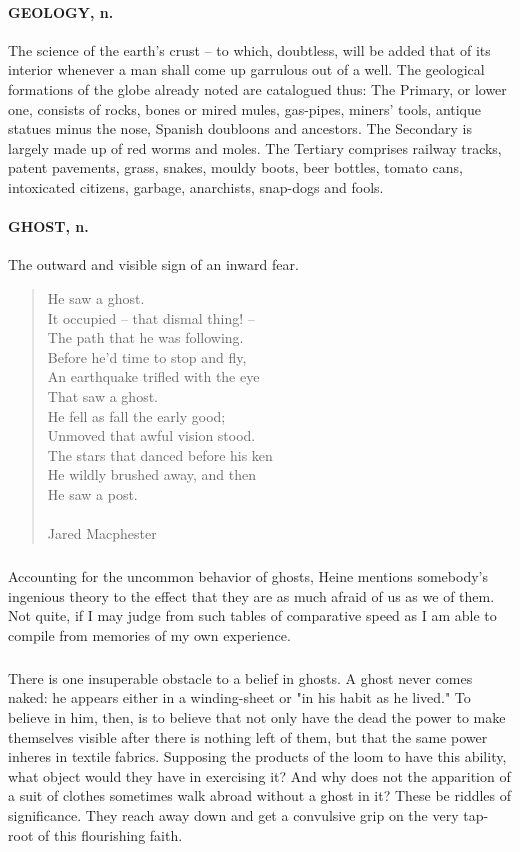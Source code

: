 \documentclass[11pt]{article}
\begin{document}
\paragraph{GEOLOGY, n.}  The science of the earth's crust -- to which, doubtless,
will be added that of its interior whenever a man shall come up
garrulous out of a well.  The geological formations of the globe
already noted are catalogued thus:  The Primary, or lower one,
consists of rocks, bones or mired mules, gas-pipes, miners' tools,
antique statues minus the nose, Spanish doubloons and ancestors.  The
Secondary is largely made up of red worms and moles.  The Tertiary
comprises railway tracks, patent pavements, grass, snakes, mouldy
boots, beer bottles, tomato cans, intoxicated citizens, garbage,
anarchists, snap-dogs and fools.

\paragraph{GHOST, n.}  The outward and visible sign of an inward fear.

\begin{quote}           He saw a ghost. \\
  It occupied -- that dismal thing! -- \\
  The path that he was following. \\
  Before he'd time to stop and fly, \\
  An earthquake trifled with the eye \\
          That saw a ghost. \\
  He fell as fall the early good; \\
  Unmoved that awful vision stood. \\
  The stars that danced before his ken \\
  He wildly brushed away, and then \\
          He saw a post. \\
 \\
Jared Macphester \end{quote}


\subparagraph{}   Accounting for the uncommon behavior of ghosts, Heine mentions
somebody's ingenious theory to the effect that they are as much 
afraid of us as we of them.  Not quite, if I may judge from such
tables of comparative speed as I am able to compile from memories of
my own experience.
\subparagraph{}   There is one insuperable obstacle to a belief in ghosts.  A ghost
never comes naked:  he appears either in a winding-sheet or "in his 
habit as he lived."  To believe in him, then, is to believe that not
only have the dead the power to make themselves visible after there is
nothing left of them, but that the same power inheres in textile
fabrics.  Supposing the products of the loom to have this ability,
what object would they have in exercising it?  And why does not the
apparition of a suit of clothes sometimes walk abroad without a ghost
in it?  These be riddles of significance.  They reach away down and
get a convulsive grip on the very tap-root of this flourishing faith.
\end{document}
